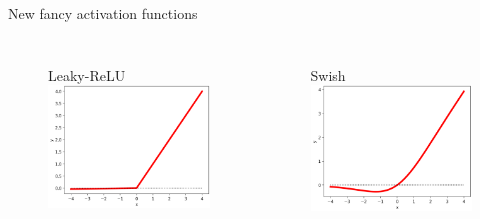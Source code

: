 \documentclass[handout]{beamer}
\begin{document}
\begin{frame}{New fancy activation functions}
\begin{columns}
    \begin{figure}
        \centering
        Leaky-ReLU\\
        \includegraphics[width=.85\textwidth]{fig/L2/activ-l-relu.png}\\
      

    \end{figure}
    \begin{figure}
     \centering
        Swish\\
        \includegraphics[width=.85\textwidth]{fig/L2/activ-swish.png}\\
     

    \end{figure}
\end{columns}
\end{frame}
\end{document}
